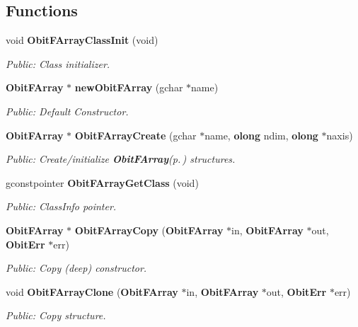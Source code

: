 \subsection*{Functions}
\begin{CompactItemize}
\item 
void {\bf Obit\-FArray\-Class\-Init} (void)
\begin{CompactList}\small\item\em Public: Class initializer. \item\end{CompactList}\item 
{\bf Obit\-FArray} $\ast$ {\bf new\-Obit\-FArray} (gchar $\ast$name)
\begin{CompactList}\small\item\em Public: Default Constructor. \item\end{CompactList}\item 
{\bf Obit\-FArray} $\ast$ {\bf Obit\-FArray\-Create} (gchar $\ast$name, {\bf olong} ndim, {\bf olong} $\ast$naxis)
\begin{CompactList}\small\item\em Public: Create/initialize {\bf Obit\-FArray}{\rm (p.\,\pageref{structObitFArray})} structures. \item\end{CompactList}\item 
gconstpointer {\bf Obit\-FArray\-Get\-Class} (void)
\begin{CompactList}\small\item\em Public: Class\-Info pointer. \item\end{CompactList}\item 
{\bf Obit\-FArray} $\ast$ {\bf Obit\-FArray\-Copy} ({\bf Obit\-FArray} $\ast$in, {\bf Obit\-FArray} $\ast$out, {\bf Obit\-Err} $\ast$err)
\begin{CompactList}\small\item\em Public: Copy (deep) constructor. \item\end{CompactList}\item 
void {\bf Obit\-FArray\-Clone} ({\bf Obit\-FArray} $\ast$in, {\bf Obit\-FArray} $\ast$out, {\bf Obit\-Err} $\ast$err)
\begin{CompactList}\small\item\em Public: Copy structure. \item\end{CompactList}\item 

\end{CompactItemize}

